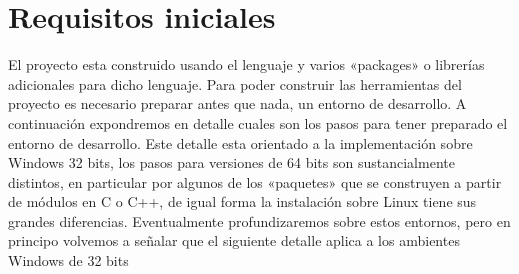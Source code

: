 \documentclass[a4paper,12pt,spanish]{sphinxmanual}
\begin{document}
\section{Requisitos iniciales}
\label{\detokenize{desarrollo:requisitos-iniciales}}\label{\detokenize{desarrollo::doc}}
El proyecto  esta construido usando el lenguaje  y varios «packages» o librerías adicionales para
dicho lenguaje. Para poder construir las herramientas del proyecto es necesario preparar antes que nada, un entorno
de desarrollo. A continuación expondremos en detalle cuales son los pasos para tener preparado el entorno de desarrollo.
Este detalle esta orientado a la implementación sobre Windows 32 bits, los pasos para versiones de 64 bits son
sustancialmente distintos, en particular por algunos de los «paquetes» que se construyen a partir de módulos en C o C++,
de igual forma la instalación sobre Linux tiene sus grandes diferencias. Eventualmente profundizaremos sobre estos
entornos, pero en principo volvemos a señalar que el siguiente detalle aplica a los ambientes Windows de 32 bits
\end{document}
